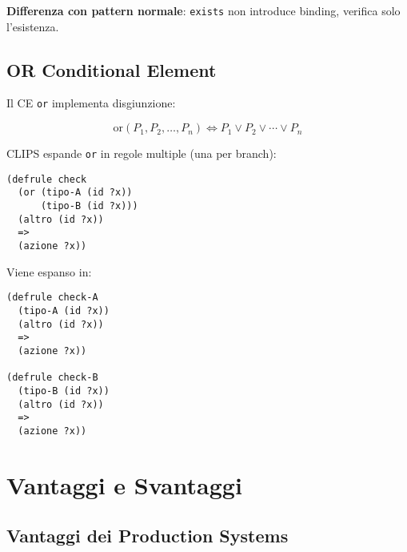 \textbf{Differenza con pattern normale}: \texttt{exists} non introduce binding, verifica solo l'esistenza.

\subsection{OR Conditional Element}

Il CE \texttt{or} implementa disgiunzione:

\begin{equation}
\text{or}(P_1, P_2, \ldots, P_n) \Leftrightarrow P_1 \lor P_2 \lor \cdots \lor P_n
\end{equation}

CLIPS espande \texttt{or} in regole multiple (una per branch):

\begin{esempio}[Espansione OR]
\begin{lstlisting}[language=CLIPS]
(defrule check
  (or (tipo-A (id ?x))
      (tipo-B (id ?x)))
  (altro (id ?x))
  =>
  (azione ?x))
\end{lstlisting}

Viene espanso in:
\begin{lstlisting}[language=CLIPS]
(defrule check-A
  (tipo-A (id ?x))
  (altro (id ?x))
  =>
  (azione ?x))

(defrule check-B
  (tipo-B (id ?x))
  (altro (id ?x))
  =>
  (azione ?x))
\end{lstlisting}
\end{esempio}

\section{Vantaggi e Svantaggi}

\subsection{Vantaggi dei Production Systems}

